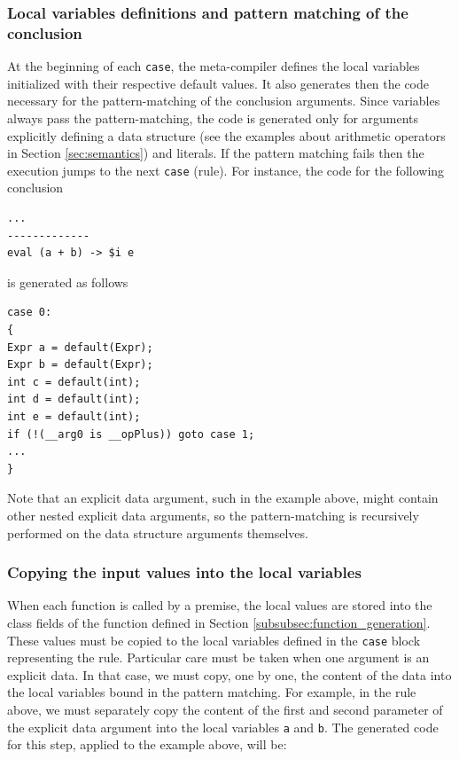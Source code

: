 \subsubsection{Local variables definitions and pattern matching of the conclusion}

At the beginning of each \texttt{case}, the meta-compiler defines the local variables initialized with their respective default values. It also generates then the code necessary for the pattern-matching of the conclusion arguments. Since variables always pass the pattern-matching, the code is generated only for arguments explicitly defining a data structure (see the examples about arithmetic operators in Section \ref{sec:semantics}) and literals. If the pattern matching fails then the execution jumps to the next \texttt{case} (rule). For instance, the code for the following conclusion

\begin{lstlisting}
...
-------------
eval (a + b) -> $i e
\end{lstlisting}

\noindent
is generated as follows

\begin{lstlisting}
case 0:
{
Expr a = default(Expr);
Expr b = default(Expr);
int c = default(int);
int d = default(int);
int e = default(int);
if (!(__arg0 is __opPlus)) goto case 1;
...
}
\end{lstlisting}

\noindent
Note that an explicit data argument, such in the example above, might contain other nested explicit data arguments, so the pattern-matching is recursively performed on the data structure arguments themselves.

\subsubsection{Copying the input values into the local variables}
When each function is called by a premise, the local values are stored into the class fields of the function defined in Section \ref{subsubsec:function_generation}. These values must be copied to the local variables defined in the \texttt{case} block representing the rule. Particular care must be taken when one argument is an explicit data. In that case, we must copy, one by one, the content of the data into the local variables bound in the pattern matching. For example, in the rule above, we must separately copy the content of the first and second parameter of the explicit data argument into the local variables \texttt{a} and \texttt{b}. The generated code for this step, applied to the example above, will be:

